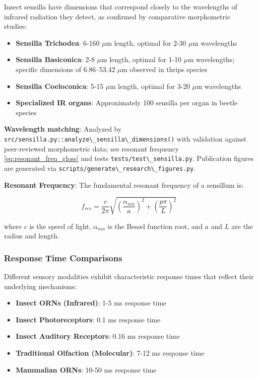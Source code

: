 \documentclass[
  13pt,
  a4paperpaper,
  12pt]{article}
\newcommand{\passthrough}[1]{#1}
\providecommand{\tightlist}{%
  \setlength{\itemsep}{0pt}\setlength{\parskip}{0pt}}
\begin{document}
Insect sensilla have dimensions that correspond closely to the
wavelengths of infrared radiation they detect, as confirmed by
comparative morphometric studies:

\begin{itemize}
\tightlist
\item
  \textbf{Sensilla Trichodea}: 6-160 \(\mu\mathrm{m}\) length, optimal
  for 2-30 \(\mu\mathrm{m}\) wavelengths
\item
  \textbf{Sensilla Basiconica}: 2-8 \(\mu\mathrm{m}\) length, optimal
  for 1-10 \(\mu\mathrm{m}\) wavelengths; specific dimensions of
  6.86--53.42 \(\mu\mathrm{m}\) observed in thrips species
\item
  \textbf{Sensilla Coeloconica}: 5-15 \(\mu\mathrm{m}\) length, optimal
  for 3-20 \(\mu\mathrm{m}\) wavelengths
\item
  \textbf{Specialized IR organs}: Approximately 100 sensilla per organ
  in beetle species
\end{itemize}

\textbf{Wavelength matching}: Analyzed by
\passthrough{\lstinline!src/sensilla.py::analyze\_sensilla\_dimensions()!}
with validation against peer-reviewed morphometric data; see resonant
frequency \eqref{eq:resonant_freq_gloss} and tests
\passthrough{\lstinline!tests/test\_sensilla.py!}. Publication figures
are generated via
\passthrough{\lstinline!scripts/generate\_research\_figures.py!}.

\textbf{Resonant Frequency}: The fundamental resonant frequency of a
sensillum is:

\begin{equation}
f_{res} = \frac{c}{2\pi} \sqrt{\left(\frac{\alpha_{mn}}{a}\right)^2 + \left(\frac{p\pi}{L}\right)^2}
\label{eq:resonant_freq_gloss}
\end{equation}

where \(c\) is the speed of light, \(\alpha_{mn}\) is the Bessel
function root, and \(a\) and \(L\) are the radius and length.

\subsubsection{Response Time
Comparisons}\label{response-time-comparisons}

Different sensory modalities exhibit characteristic response times that
reflect their underlying mechanisms:

\begin{itemize}
\tightlist
\item
  \textbf{Insect ORNs (Infrared)}: 1-5 ms response time
\item
  \textbf{Insect Photoreceptors}: 0.1 ms response time
\item
  \textbf{Insect Auditory Receptors}: 0.16 ms response time
\item
  \textbf{Traditional Olfaction (Molecular)}: 7-12 ms response time
\item
  \textbf{Mammalian ORNs}: 10-50 ms response time
\end{itemize}
\end{document}
